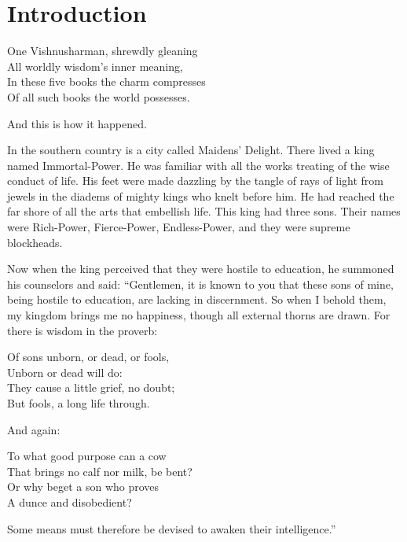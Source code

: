 



\chapter{Introduction}

\begin{pverse}
One Vishnusharman, shrewdly gleaning\\
All worldly wisdom's inner meaning,\\
In these five books the charm compresses\\
Of all such books the world possesses.
\end{pverse}
And this is how it happened.

In the southern country is a city called Maidens'
Delight. There lived a king named Immortal-Power.
He was familiar with all the works treating of the wise
conduct of life. His feet were made dazzling by the
tangle of rays of light from jewels in the diadems of
mighty kings who knelt before him. He had reached
the far shore of all the arts that embellish life. This
king had three sons. Their names were Rich-Power,
Fierce-Power, Endless-Power, and they were supreme
blockheads.

Now when the king perceived that they were
hostile to education, he summoned his counselors and
said: ``Gentlemen, it is known to you that these sons
of mine, being hostile to education, are lacking in discernment.
So when I behold them, my kingdom
brings me no happiness, though all external thorns are
drawn. For there is wisdom in the proverb:

\begin{pverse}
  Of sons unborn, or dead, or fools,\\
  Unborn or dead will do:\\
  They cause a little grief, no doubt;\\
  But fools, a long life through.
\end{pverse}

And again:

\begin{pverse}
  To what good purpose can a cow\\
  That brings no calf nor milk, be bent?\\
  Or why beget a son who proves\\
  A dunce and disobedient?
\end{pverse}

Some means must therefore be devised to awaken their intelligence.''


